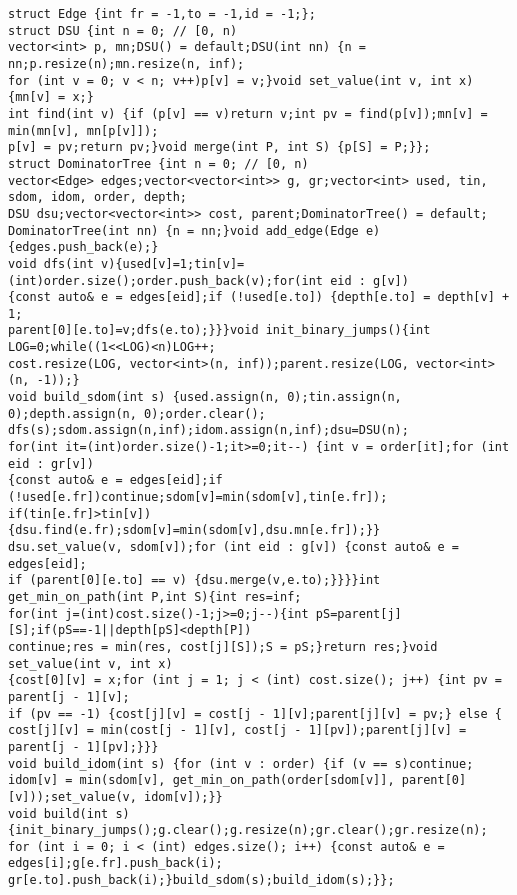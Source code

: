 \documentclass[a4paper,12pt]{article}
\begin{document}
\begin{verbatim}
struct Edge {int fr = -1,to = -1,id = -1;};
struct DSU {int n = 0; // [0, n)
vector<int> p, mn;DSU() = default;DSU(int nn) {n = nn;p.resize(n);mn.resize(n, inf);
for (int v = 0; v < n; v++)p[v] = v;}void set_value(int v, int x) {mn[v] = x;}
int find(int v) {if (p[v] == v)return v;int pv = find(p[v]);mn[v] = min(mn[v], mn[p[v]]);
p[v] = pv;return pv;}void merge(int P, int S) {p[S] = P;}};
struct DominatorTree {int n = 0; // [0, n)
vector<Edge> edges;vector<vector<int>> g, gr;vector<int> used, tin, sdom, idom, order, depth;
DSU dsu;vector<vector<int>> cost, parent;DominatorTree() = default;
DominatorTree(int nn) {n = nn;}void add_edge(Edge e) {edges.push_back(e);}
void dfs(int v){used[v]=1;tin[v]=(int)order.size();order.push_back(v);for(int eid : g[v]) 
{const auto& e = edges[eid];if (!used[e.to]) {depth[e.to] = depth[v] + 1;
parent[0][e.to]=v;dfs(e.to);}}}void init_binary_jumps(){int LOG=0;while((1<<LOG)<n)LOG++;
cost.resize(LOG, vector<int>(n, inf));parent.resize(LOG, vector<int>(n, -1));}
void build_sdom(int s) {used.assign(n, 0);tin.assign(n, 0);depth.assign(n, 0);order.clear();
dfs(s);sdom.assign(n,inf);idom.assign(n,inf);dsu=DSU(n);
for(int it=(int)order.size()-1;it>=0;it--) {int v = order[it];for (int eid : gr[v]) 
{const auto& e = edges[eid];if (!used[e.fr])continue;sdom[v]=min(sdom[v],tin[e.fr]);
if(tin[e.fr]>tin[v]){dsu.find(e.fr);sdom[v]=min(sdom[v],dsu.mn[e.fr]);}}
dsu.set_value(v, sdom[v]);for (int eid : g[v]) {const auto& e = edges[eid];
if (parent[0][e.to] == v) {dsu.merge(v,e.to);}}}}int get_min_on_path(int P,int S){int res=inf;
for(int j=(int)cost.size()-1;j>=0;j--){int pS=parent[j][S];if(pS==-1||depth[pS]<depth[P])
continue;res = min(res, cost[j][S]);S = pS;}return res;}void set_value(int v, int x) 
{cost[0][v] = x;for (int j = 1; j < (int) cost.size(); j++) {int pv = parent[j - 1][v];
if (pv == -1) {cost[j][v] = cost[j - 1][v];parent[j][v] = pv;} else {
cost[j][v] = min(cost[j - 1][v], cost[j - 1][pv]);parent[j][v] = parent[j - 1][pv];}}}
void build_idom(int s) {for (int v : order) {if (v == s)continue;
idom[v] = min(sdom[v], get_min_on_path(order[sdom[v]], parent[0][v]));set_value(v, idom[v]);}}
void build(int s) {init_binary_jumps();g.clear();g.resize(n);gr.clear();gr.resize(n);
for (int i = 0; i < (int) edges.size(); i++) {const auto& e = edges[i];g[e.fr].push_back(i);
gr[e.to].push_back(i);}build_sdom(s);build_idom(s);}};
\end{verbatim}
\end{document}

